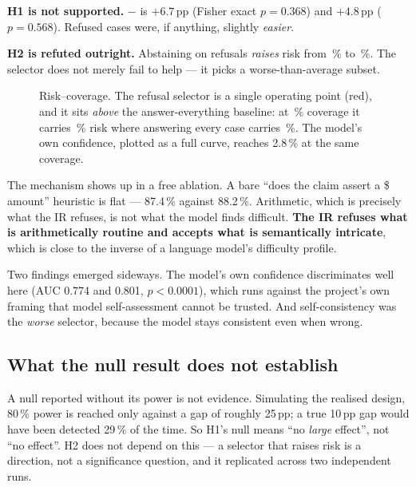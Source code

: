 \documentclass[11pt]{article}
\begin{document}
\begin{negative}[title={Both hypotheses fail}]
\textbf{H1 is not supported.}  $-$  is
$+6.7$\,pp (Fisher exact $p = 0.368$) and $+4.8$\,pp ($p = 0.568$). Refused
cases were, if anything, slightly \emph{easier}.

\textbf{H2 is refuted outright.} Abstaining on refusals \emph{raises} risk
from \rcAnswerAllRisk\,\% to \rcRefusalRisk\,\%. The selector does not
merely fail to help --- it picks a worse-than-average subset.
\end{negative}

\begin{figure}[htbp]
  \centering
  
  \caption{Risk--coverage. The refusal selector is a single operating point
    (red), and it sits \emph{above} the answer-everything baseline: at
    \rcCoverage\,\% coverage it carries \rcRefusalRisk\,\% risk where
    answering every case carries \rcAnswerAllRisk\,\%. The model's own
    confidence, plotted as a full curve, reaches 2.8\,\% at the same
    coverage.}
  \label{fig:rc}
\end{figure}

The mechanism shows up in a free ablation. A bare ``does the claim assert a
\$ amount'' heuristic is flat --- 87.4\,\% against 88.2\,\%. Arithmetic,
which is precisely what the IR refuses, is not what the model finds
difficult. \textbf{The IR refuses what is arithmetically routine and
accepts what is semantically intricate}, which is close to the inverse of a
language model's difficulty profile.

Two findings emerged sideways. The model's own confidence discriminates
well here (AUC 0.774 and 0.801, $p < 0.0001$), which runs against the
project's own framing that model self-assessment cannot be trusted. And
self-consistency was the \emph{worse} selector, because the model stays
consistent even when wrong.

\subsection{What the null result does not establish}

A null reported without its power is not evidence. Simulating the realised
design, 80\,\% power is reached only against a gap of roughly 25\,pp; a
true 10\,pp gap would have been detected 29\,\% of the time. So H1's null
means ``no \emph{large} effect'', not ``no effect''. H2 does not depend on
this --- a selector that raises risk is a direction, not a significance
question, and it replicated across two independent runs.
\end{document}
